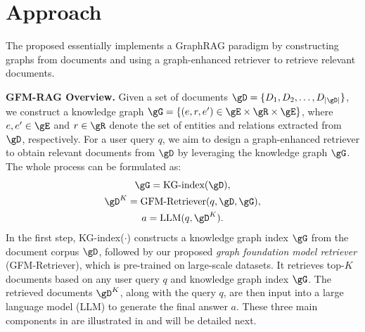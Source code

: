 
\section{Approach}\label{sec:approach}

The proposed \ourmethod essentially implements a GraphRAG paradigm by constructing graphs from documents and using a graph-enhanced retriever to retrieve relevant documents.

\noindent\textbf{GFM-RAG Overview.}
Given a set of documents $\gD=\{D_1,D_2,\ldots,D_{|\gD|}\}$, we construct a knowledge graph $\gG=\{(e,r,e')\in \gE\times\gR\times\gE\}$, where $e,e'\in\gE$ and $r\in\gR$ denote the set of entities and relations extracted from $\gD$, respectively. 
%
For a user query $q$, we aim to design a graph-enhanced retriever to obtain relevant documents from $\gD$ by leveraging the knowledge graph $\gG$. The whole \ourmethod process can be formulated as:
\begin{gather}
    \gG = \text{KG-index}(\gD), \\ \gD^K = \text{GFM-Retriever}(q,\gD,\gG),\\
    a = \text{LLM}(q,\gD^K).
\end{gather}
In the first step, KG-index($\cdot$)  constructs a knowledge graph index $\gG$ from the document corpus $\gD$, followed by our proposed \emph{graph foundation model retriever} (GFM-Retriever), which is pre-trained on large-scale datasets. It retrieves top-$K$ documents based on any user query $q$ and knowledge graph index $\gG$. The retrieved documents $\gD^K$, along with the query $q$, are then input into a large language model (LLM) to generate the final answer $a$.
%
These three main components in \ourmethod are illustrated in  and will be detailed next.

